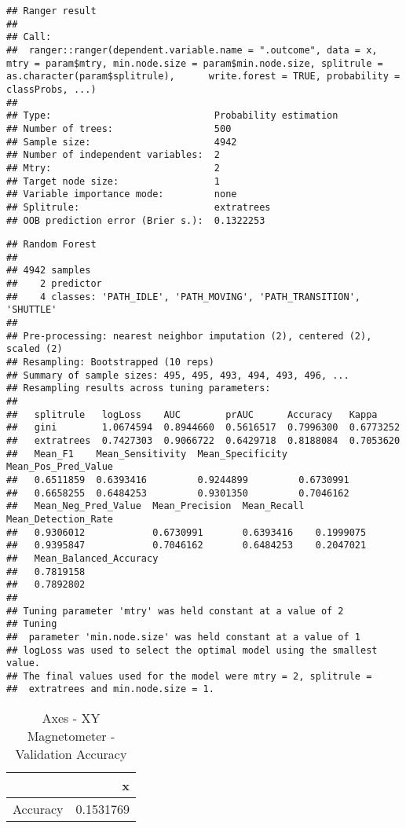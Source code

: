 \documentclass[]{article}
\begin{document}
\begin{verbatim}
## Ranger result
## 
## Call:
##  ranger::ranger(dependent.variable.name = ".outcome", data = x,      mtry = param$mtry, min.node.size = param$min.node.size, splitrule = as.character(param$splitrule),      write.forest = TRUE, probability = classProbs, ...) 
## 
## Type:                             Probability estimation 
## Number of trees:                  500 
## Sample size:                      4942 
## Number of independent variables:  2 
## Mtry:                             2 
## Target node size:                 1 
## Variable importance mode:         none 
## Splitrule:                        extratrees 
## OOB prediction error (Brier s.):  0.1322253
\end{verbatim}

\begin{verbatim}
## Random Forest 
## 
## 4942 samples
##    2 predictor
##    4 classes: 'PATH_IDLE', 'PATH_MOVING', 'PATH_TRANSITION', 'SHUTTLE' 
## 
## Pre-processing: nearest neighbor imputation (2), centered (2), scaled (2) 
## Resampling: Bootstrapped (10 reps) 
## Summary of sample sizes: 495, 495, 493, 494, 493, 496, ... 
## Resampling results across tuning parameters:
## 
##   splitrule   logLoss    AUC        prAUC      Accuracy   Kappa    
##   gini        1.0674594  0.8944660  0.5616517  0.7996300  0.6773252
##   extratrees  0.7427303  0.9066722  0.6429718  0.8188084  0.7053620
##   Mean_F1    Mean_Sensitivity  Mean_Specificity  Mean_Pos_Pred_Value
##   0.6511859  0.6393416         0.9244899         0.6730991          
##   0.6658255  0.6484253         0.9301350         0.7046162          
##   Mean_Neg_Pred_Value  Mean_Precision  Mean_Recall  Mean_Detection_Rate
##   0.9306012            0.6730991       0.6393416    0.1999075          
##   0.9395847            0.7046162       0.6484253    0.2047021          
##   Mean_Balanced_Accuracy
##   0.7819158             
##   0.7892802             
## 
## Tuning parameter 'mtry' was held constant at a value of 2
## Tuning
##  parameter 'min.node.size' was held constant at a value of 1
## logLoss was used to select the optimal model using the smallest value.
## The final values used for the model were mtry = 2, splitrule =
##  extratrees and min.node.size = 1.
\end{verbatim}

\begin{table}[!h]

\caption{\label{tab:sensor-xy-mag-rf-results}Axes - XY Magnetometer - Validation Accuracy}
\centering
\begin{tabular}[t]{lr}
\toprule
  & x\\
\midrule
Accuracy & 0.1531769\\
\bottomrule
\end{tabular}
\end{table}
\end{document}
